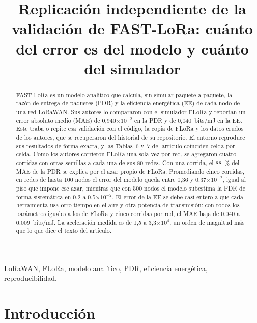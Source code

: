 \documentclass[conference,a4paper]{IEEEtran}
\begin{document}
\title{Replicación independiente de la validación de FAST-LoRa: cuánto del error es del modelo y cuánto del simulador}

\author{
}

\maketitle

\begin{abstract}
FAST-LoRa es un modelo analítico que calcula, sin simular paquete a paquete, la razón de entrega de paquetes (PDR) y la eficiencia energética (EE) de cada nodo de una red LoRaWAN. Sus autores lo compararon con el simulador FLoRa y reportan un error absoluto medio (MAE) de 0,940$\times10^{-2}$ en la PDR y de 0,040~bits/mJ en la EE. Este trabajo repite esa validación con el código, la copia de FLoRa y los datos crudos de los autores, que se recuperaron del historial de su repositorio. El entorno reproduce sus resultados de forma exacta, y las Tablas~6 y~7 del artículo coinciden celda por celda. Como los autores corrieron FLoRa una sola vez por red, se agregaron cuatro corridas con otras semillas a cada una de sus 80 redes. Con una corrida, el 88~\% del MAE de la PDR se explica por el azar propio de FLoRa. Promediando cinco corridas, en redes de hasta 100 nodos el error del modelo queda entre 0,36 y 0,37$\times10^{-2}$, igual al piso que impone ese azar, mientras que con 500 nodos el modelo subestima la PDR de forma sistemática en 0,2 a 0,5$\times10^{-2}$. El error de la EE se debe casi entero a que cada herramienta usa otro tiempo en el aire y otra potencia de transmisión: con todos los parámetros iguales a los de FLoRa y cinco corridas por red, el MAE baja de 0,040 a 0,009~bits/mJ. La aceleración medida es de 1,5 a 3,3$\times10^{4}$, un orden de magnitud más que lo que dice el texto del artículo.
\end{abstract}

\begin{IEEEkeywords}
LoRaWAN, FLoRa, modelo analítico, PDR, eficiencia energética, reproducibilidad.
\end{IEEEkeywords}

\section{Introducción}
\end{document}
